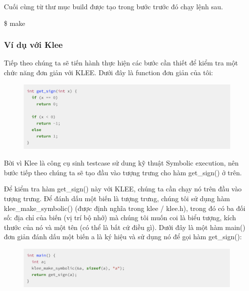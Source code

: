 \documentclass[12pt,a4paper]{article}
\begin{document}
Cuối cùng từ thư mục build được tạo trong bước trước đó chạy lệnh sau.

\$ make

\subsubsection{Ví dụ với Klee}

Tiếp theo chúng ta sẽ tiến hành thực hiện các bước cần thiết để kiểm tra một chức năng đơn giản với KLEE. Dưới đây là function đơn giản của tôi:

\begin{figure}[ht]
\begin{center}
\includegraphics[scale=.3]{hinhanh/functionexample.png}
\end{center}
\end{figure}

Bời vì Klee là công cụ sinh testcase sử dung kỹ thuật Symbolic execution, nên bước tiếp theo chúng ta sẽ tạo đầu vào tượng trưng cho hàm get\_sign() ở trên.

Để kiểm tra hàm get\_sign() này với KLEE, chúng ta cần chạy nó trên đầu vào tượng trưng. Để đánh dấu một biến là tượng trưng, chúng tôi sử dụng hàm klee\_make\_symbolic() (được định nghĩa trong klee / klee.h), trong đó có ba đối số: địa chỉ của biến (vị trí bộ nhớ) mà chúng tôi muốn coi là biểu tượng, kích thước của nó và một tên (có thể là bất cứ điều gì). Dưới đây là một hàm main() đơn giản đánh dấu một biến a là ký hiệu và sử dụng nó để gọi hàm get\_sign():

\begin{figure}[ht]
\begin{center}
\includegraphics[scale=.3]{hinhanh/mainexample.png}
\end{center}
\end{figure}
\end{document}
